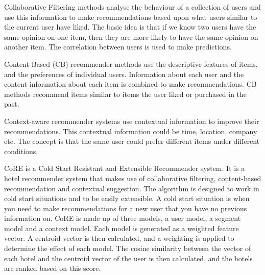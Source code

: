Collaborative Filtering methods analyse the behaviour of a collection of users and use this information to make recommendations based upon what users similar to the current user have liked. The basic idea is that if we know two users have the same opinion on one item, then they are more likely to have the same opinion on another item. The correlation between users is used to make predictions.

Content-Based (CB) recommender methods use the descriptive features of items, and the preferences of individual users. Information about each user and the content information about each item is combined to make recommendations. CB methods recommend items similar to items the user liked or purchased in the past.

Context-aware recommender systems use contextual information to improve their recommendations. This contextual information could be time, location, company etc. The concept is that the same user could prefer different items under different conditions.

CoRE \cite{core2019} is a Cold Start Resistant and Extensible Recommender system. It is a hotel recommender system that makes use of collaborative filtering, content-based recommendation and contextual suggestion. The algorithm is designed to work in cold start situations and to be easily extensible. A cold start situation is when you need to make recommendations for a new user that you have no previous information on. CoRE is made up of three models, a user model, a segment model and a context model. Each model is generated as a weighted feature vector. A centroid vector is then calculated, and a weighting is applied to determine the effect of each model. The cosine similarity between the vector of each hotel and the centroid vector of the user is then calculated, and the hotels are ranked based on this score.